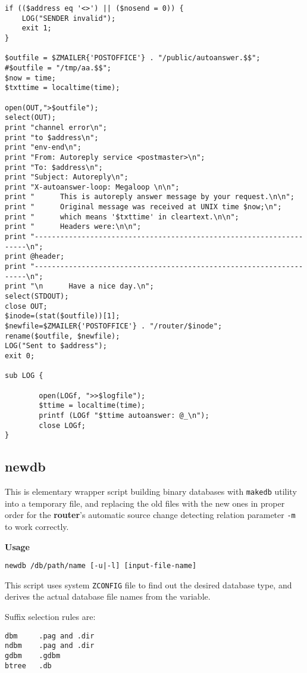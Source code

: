 \begin{verbatim}
if (($address eq '<>') || ($nosend = 0)) {
    LOG("SENDER invalid");
    exit 1;
}

$outfile = $ZMAILER{'POSTOFFICE'} . "/public/autoanswer.$$";
#$outfile = "/tmp/aa.$$";
$now = time;
$txttime = localtime(time);

open(OUT,">$outfile");
select(OUT);
print "channel error\n";
print "to $address\n";
print "env-end\n"; 
print "From: Autoreply service <postmaster>\n";
print "To: $address\n";
print "Subject: Autoreply\n";
print "X-autoanswer-loop: Megaloop \n\n";
print "      This is autoreply answer message by your request.\n\n";
print "      Original message was received at UNIX time $now;\n";
print "      which means '$txttime' in cleartext.\n\n";
print "      Headers were:\n\n";
print "--------------------------------------------------------------------\n";
print @header;
print "--------------------------------------------------------------------\n";
print "\n      Have a nice day.\n";
select(STDOUT);
close OUT;
$inode=(stat($outfile))[1];
$newfile=$ZMAILER{'POSTOFFICE'} . "/router/$inode";
rename($outfile, $newfile);
LOG("Sent to $address");
exit 0;

sub LOG {

        open(LOGf, ">>$logfile");
        $ttime = localtime(time);
        printf (LOGf "$ttime autoanswer: @_\n");
        close LOGf;
}
\end{verbatim}


\subsection{newdb}


This is elementary wrapper script building binary databases
with {\tt makedb} utility into a temporary file, and replacing
the old files with the new ones in proper order for the 
{\bf router}'s automatic source change detecting relation 
parameter {\tt -m} to work correctly.

{\bf Usage}

\begin{verbatim}
newdb /db/path/name [-u|-l] [input-file-name]
\end{verbatim}

This script uses system {\tt ZCONFIG} file to find out the desired
database type, and derives the actual database file names from the 
variable.

Suffix selection rules are:

\begin{verbatim}
dbm     .pag and .dir
ndbm    .pag and .dir
gdbm    .gdbm
btree   .db   
\end{verbatim}
